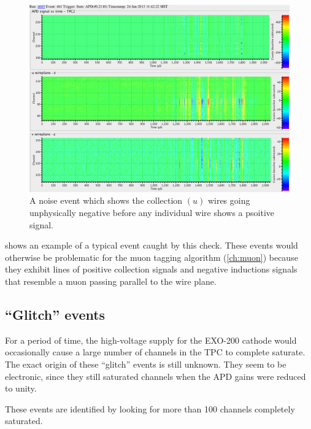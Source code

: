 \documentclass[herrin-thesis.tex]{subfiles}
\begin{document}
\begin{figure}[tbp]
\centering
\includegraphics[width=\columnwidth]{./plots/noise_eventdisplay_run_4685_ev_0441.png}
\caption{A noise event which shows the collection \((u)\) wires going unphysically negative before any individual wire shows a psoitive signal.}
\label{fig:noise_sum_u_neg}
\end{figure}

 shows an example of a typical event caught by this check. These events would otherwise be problematic for the muon tagging algorithm (\cref{ch:muon}) because they exhibit lines of positive collection signals and negative inductions signals that resemble a muon passing parallel to the wire plane.

\subsection{``Glitch'' events}
For a period of time, the high-voltage supply for the EXO-200 cathode would occasionally cause a large number of channels in the TPC to complete saturate. The exact origin of these ``glitch'' events is still unknown. They seem to be electronic, since they still saturated channels when the APD gains were reduced to unity.

These events are identified by looking for more than 100 channels completely saturated.
\end{document}
